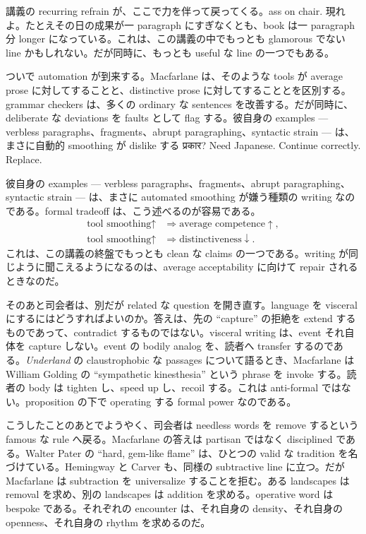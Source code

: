 講義の recurring refrain が、ここで力を伴って戻ってくる。ass on chair. 現れよ。たとえその日の成果が一 paragraph にすぎなくとも、book は一 paragraph 分 longer になっている。これは、この講義の中でもっとも glamorous でない line かもしれない。だが同時に、もっとも useful な line の一つでもある。

ついで automation が到来する。Macfarlane は、そのような tools が average prose に対してすることと、distinctive prose に対してすることとを区別する。grammar checkers は、多くの ordinary な sentences を改善する。だが同時に、deliberate な deviations を faults として flag する。彼自身の examples --- verbless paragraphs、fragments、abrupt paragraphing、syntactic strain --- は、まさに自動的 smoothing が dislike する प्रकार? Need Japanese. Continue correctly. Replace.

彼自身の examples --- verbless paragraphs、fragments、abrupt paragraphing、syntactic strain --- は、まさに automated smoothing が嫌う種類の writing なのである。formal tradeoff は、こう述べるのが容易である。
\begin{align}
\text{tool smoothing} \uparrow &\Longrightarrow \text{average competence} \uparrow,\\
\text{tool smoothing} \uparrow &\Longrightarrow \text{distinctiveness} \downarrow.
\end{align}
これは、この講義の終盤でもっとも clean な claims の一つである。writing が同じように聞こえるようになるのは、average acceptability に向けて repair されるときなのだ。

そのあと司会者は、別だが related な question を開き直す。language を visceral にするにはどうすればよいのか。答えは、先の ``capture'' の拒絶を extend するものであって、contradict するものではない。visceral writing は、event それ自体を capture しない。event の bodily analog を、読者へ transfer するのである。\emph{Underland} の claustrophobic な passages について語るとき、Macfarlane は William Golding の ``sympathetic kinesthesia'' という phrase を invoke する。読者の body は tighten し、speed up し、recoil する。これは anti-formal ではない。proposition の下で operating する formal power なのである。

こうしたことのあとでようやく、司会者は needless words を remove するという famous な rule へ戻る。Macfarlane の答えは partisan ではなく disciplined である。Walter Pater の ``hard, gem-like flame'' は、ひとつの valid な tradition を名づけている。Hemingway と Carver も、同様の subtractive line に立つ。だが Macfarlane は subtraction を universalize することを拒む。ある landscapes は removal を求め、別の landscapes は addition を求める。operative word は bespoke である。それぞれの encounter は、それ自身の density、それ自身の openness、それ自身の rhythm を求めるのだ。

